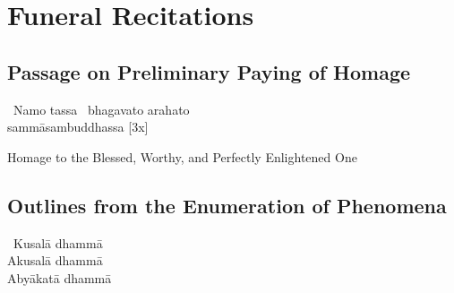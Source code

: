 
\ifdigital
\fi

\ifninebythirteen
\fi

\ifbfive
\fi

\chapter{Funeral Recitations}

\ifbfive
\fi

\ifninebythirteen
  \fi

\clearpage



\section{Passage on Preliminary Paying of Homage}
\label{passage-on-preliminary-paying-of-homage-funeral}

\begin{pali-hang-together}
  \anglebracketleft\ \hspace{-0.5mm}Namo tassa \hspace{-0.5mm}\anglebracketright\ bhagavato arahato \ifninebythirteen\\ \fi sammāsambuddhassa \hfill{[3x]}
\end{pali-hang-together}

\begin{english-hang}
  Homage to the Blessed, Worthy, and Perfectly Enlightened One
\end{english-hang}

\suttaRef{[DN 21]}



\section{Outlines from the Enumeration of Phenomena}
\label{enumeration-of-phenomena}

\begin{pali-hang-together}
  \anglebracketleft\ \hspace{-0.5mm}Kusalā dhammā \hspace{-0.5mm}\anglebracketright\ \\
  Akusalā dhammā\\
  Abyākatā dhammā
\end{pali-hang-together}

